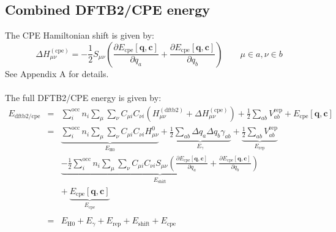 \documentclass{article}
\numberwithin{equation}{section}
\begin{document}
\subsection{Combined DFTB2/CPE energy}
The CPE Hamiltonian shift is given by:\cite{gieseyork2012}
\begin{equation}
    \Delta H_{\mu\nu}^{\mathrm{(cpe)}} =  - \frac{1}{2} S_{\mu\nu} \left(
    \frac{\partial E_{\mathrm{cpe}}\left[\mathbf{q}, \mathbf{c}\right]}{\partial q_a} +
    \frac{\partial E_{\mathrm{cpe}}\left[\mathbf{q}, \mathbf{c}\right]}{\partial q_b}
\right) \qquad \mu \in a, \nu \in b
\end{equation}
See Appendix A for details.
\\\\The full DFTB2/CPE energy is given by:
\begin{eqnarray}
    E_\mathrm{{dftb2/cpe}} &=& \sum_i^\mathrm{occ} n_i \sum_{\mu} \sum_{\nu}  C_{\mu i} C_{\nu i} \left(H_{\mu\nu}^{\mathrm{(dftb2)}} + \Delta H_{\mu\nu}^{\mathrm{(cpe)}} \right) 
    + \frac{1}{2} \sum_{ab} V^\mathrm{rep}_{ab}
    + E_{\mathrm{cpe}}\left[\mathbf{q}, \mathbf{c}\right] \nonumber\\
    &=& \underbrace{\sum_i^\mathrm{occ} n_i  \sum_\mu \sum_\nu C_{\mu i}  C_{\nu i} H^0_{\mu\nu}}_{E_\mathrm{H0}}
        + \underbrace{\frac{1}{2} \sum_{ab} \Delta q_a \Delta q_b \gamma_{ab}}_{E_\gamma}
    + \underbrace{\frac{1}{2} \sum_{ab} V^\mathrm{rep}_{ab}}_{E_\mathrm{rep}}\nonumber\\
        && \underbrace{- \frac{1}{2} \sum_i^\mathrm{occ} n_i \sum_{\mu} \sum_{\nu}  C_{\mu i} C_{\nu i} S_{\mu\nu} \left(
    \frac{\partial E_{\mathrm{cpe}}\left[\mathbf{q}, \mathbf{c}\right]}{\partial q_a} +
    \frac{\partial E_{\mathrm{cpe}}\left[\mathbf{q}, \mathbf{c}\right]}{\partial q_b}
\right)}_{E_\mathrm{shift}}\nonumber\\
&& +\ \underbrace{E_{\mathrm{cpe}}\left[\mathbf{q}, \mathbf{c}\right]}_{E_\mathrm{cpe}}\\\nonumber\\
&=&  E_\mathrm{H0} + E_\gamma + E_\mathrm{rep} + E_\mathrm{shift} + E_\mathrm{cpe}\label{eq:shorthand}
\end{eqnarray}
\end{document}
